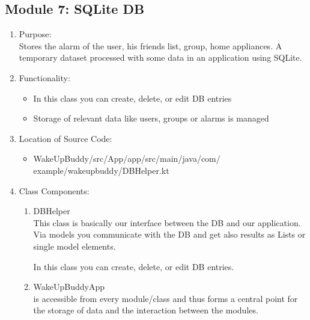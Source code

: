 \documentclass[conference]{IEEEtran}
\begin{document}
\subsection{Module 7: SQLite DB}
\begin{enumerate}
    \item Purpose: \\
    Stores the alarm of the user, his friends list, group, home appliances. A temporary dataset processed with some data in an application using SQLite.\\ 

    \item Functionality: \\
        \begin{itemize}
            \item In this class you can create, delete, or edit DB entries
            \item Storage of relevant data like users, groups or alarms is managed
        \end{itemize}
    \item Location of Source Code:
    \begin{itemize}
        \item WakeUpBuddy/src/App/app/src/main/java/com/
        example/wakeupbuddy/DBHelper.kt
    \end{itemize} 
    \item Class Components:
    \begin{enumerate}
        \item DBHelper \\
            This class is basically our interface between the DB and our application. Via models you communicate with the DB and get also results as Lists or single model elements. 
            \par In this class you can create, delete, or edit DB entries.
        \item WakeUpBuddyApp \\
        is accessible from every module/class and thus forms a central point for the storage of data and the interaction between the modules.
    \end{enumerate}
\end{enumerate}
\vspace{10pt}
\end{document}
